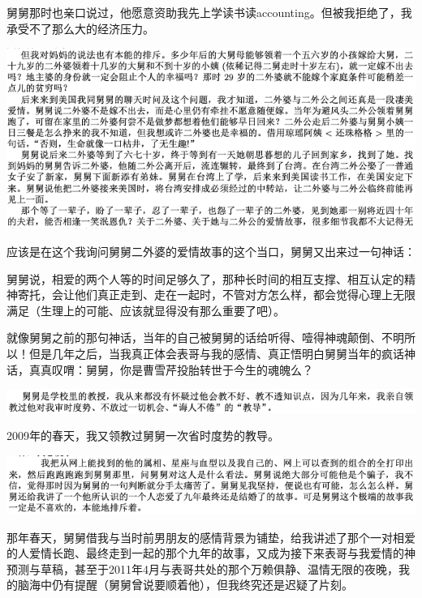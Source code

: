 \documentclass[9pt, b5paper]{article}
\begin{document}
舅舅那时也亲口说过，他愿意资助我先上学读书读accounting。但被我拒绝了，我承受不了那么大的经济压力。 

\begin{center}
\includegraphics[width=.9\linewidth]{./pic/p1p108-2.png}
\end{center}

应该是在这个我询问舅舅二外婆的爱情故事的这个当口，舅舅又出来过一句神话：

舅舅说，相爱的两个人等的时间足够久了，那种长时间的相互支撑、相互认定的精神寄托，会让他们真正走到、走在一起时，不管对方怎么样，都会觉得心理上无限满足（生理上的可能、应该就显得没有那么重要了吧）。

就像舅舅之前的那句神话，当年的自己被舅舅的话给听得、噎得神魂颠倒、不明所以！但是几年之后，当我真正体会表哥与我的感情、真正悟明白舅舅当年的疯话神话，真真叹喟：舅舅，你是曹雪芹投胎转世于今生的魂魄么？

\begin{center}
\includegraphics[width=.9\linewidth]{./pic/p1p111.png}
\end{center}

2009年的春天，我又领教过舅舅一次省时度势的教导。 

\begin{center}
\includegraphics[width=.9\linewidth]{./pic/p1p34-3.png}
\end{center}

那年春天，舅舅借我与当时前男朋友的感情背景为铺垫，给我讲述了那个一对相爱的人爱情长跑、最终走到一起的那个九年的故事，又成为接下来表哥与我爱情的神预测与草稿，甚至于2011年4月与表哥共处的那个万赖俱静、温情无限的夜晚，我的脑海中仍有提醒（舅舅曾说要顺着他），但我终究还是迟疑了片刻。
\end{document}

